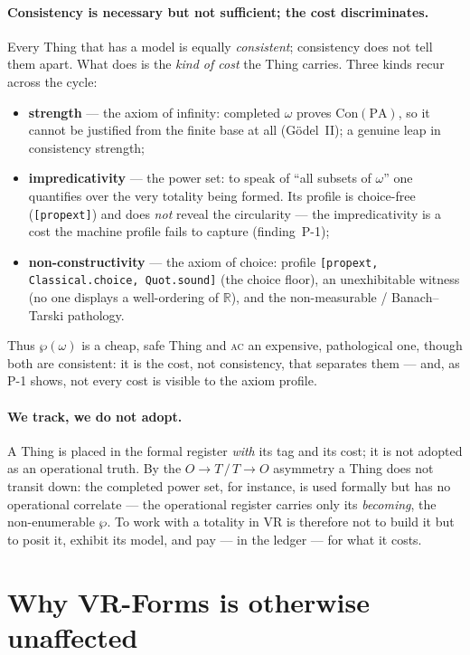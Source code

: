 \documentclass[11pt]{article}
\begin{document}
\paragraph{Consistency is necessary but not sufficient; the cost discriminates.}
Every Thing that has a model is equally \emph{consistent}; consistency does not tell them apart.
What does is the \emph{kind of cost} the Thing carries. Three kinds recur across the cycle:
\begin{itemize}
  \item \textbf{strength} --- the axiom of infinity: completed $\omega$ proves $\mathrm{Con}(\mathrm{PA})$,
    so it cannot be justified from the finite base at all (G\"odel~II); a genuine leap in consistency
    strength;
  \item \textbf{impredicativity} --- the power set: to speak of ``all subsets of $\omega$'' one
    quantifies over the very totality being formed. Its profile is choice-free (\texttt{[propext]})
    and does \emph{not} reveal the circularity --- the impredicativity is a cost the machine profile
    fails to capture (finding~P-1);
  \item \textbf{non-constructivity} --- the axiom of choice: profile
    \texttt{[propext, Classical.choice, Quot.sound]} (the choice floor), an unexhibitable witness (no
    one displays a well-ordering of $\mathbb{R}$), and the non-measurable / Banach--Tarski pathology.
\end{itemize}
Thus $\wp(\omega)$ is a cheap, safe Thing and \textsc{ac} an expensive, pathological one, though both
are consistent: it is the cost, not consistency, that separates them --- and, as P-1 shows, not every
cost is visible to the axiom profile.

\paragraph{We track, we do not adopt.}
A Thing is placed in the formal register \emph{with} its tag and its cost; it is not adopted as an
operational truth. By the $O\!\to\!T\,/\,T\!\to\!O$ asymmetry a Thing does not transit down: the
completed power set, for instance, is used formally but has no operational correlate --- the
operational register carries only its \emph{becoming}, the non-enumerable $\wp$. To work with a
totality in VR is therefore not to build it but to posit it, exhibit its model, and pay --- in the
ledger --- for what it costs.

\section*{Why VR-Forms is otherwise unaffected}
\end{document}
